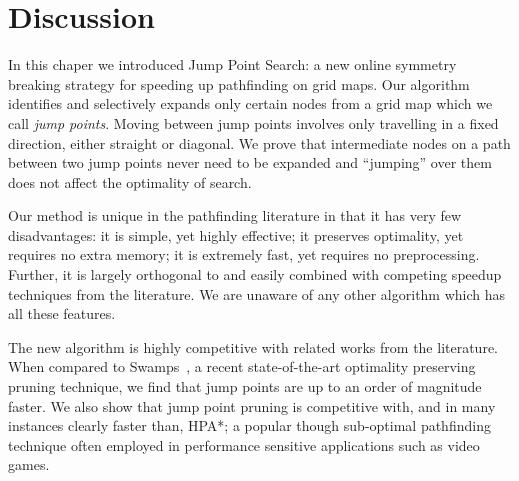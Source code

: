 \section{Discussion}
\label{cha::jps::discussion}
In this chaper we introduced Jump Point Search: a new online symmetry breaking
strategy for speeding up pathfinding on grid maps.  Our algorithm identifies
and selectively expands only certain nodes from a grid map which we call
\emph{jump points}.  Moving between jump points involves only travelling in a
fixed direction, either straight or diagonal.  We prove that intermediate nodes
on a path between two jump points never need to be expanded and ``jumping'' over
them does not affect the optimality of search. 
\par
Our method is unique in the pathfinding literature in that it has very few
disadvantages: it is simple, yet highly effective; it preserves optimality, yet
requires no extra memory;  it is extremely fast, yet requires no preprocessing.
Further, it is largely orthogonal to and easily combined with 
competing speedup techniques from the literature.
We are unaware of any other algorithm which has all these features.
\par
The new algorithm is highly competitive with related works from the literature.
When compared to Swamps~\cite{pochter10}, 
a recent state-of-the-art optimality preserving pruning
technique, we find that jump points are up to an order of magnitude faster.
We also show that jump point pruning is competitive with, and in
many instances clearly faster than, HPA*; a popular though sub-optimal pathfinding
technique often employed in performance sensitive applications such as
video games.
